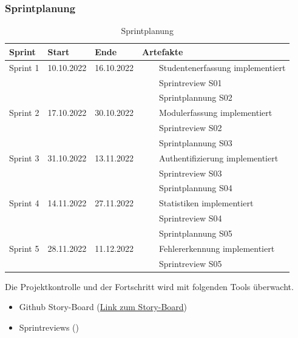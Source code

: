 \documentclass[a4paper, table]{article}
\newcommand{\tabitem}{~~\llap{\textbullet}~~}
\begin{document}
\subsubsection*{Sprintplanung}
\begin{table}[h]
    \centering
    \begin{tabular}{|l|l|l|l|}
        \hline
        \rowcolor[gray]{.9} Sprint & Start & Ende & Artefakte \\
        \hline
        Sprint 1 & 10.10.2022 & 16.10.2022 & \tabitem Studentenerfassung implementiert \\
         & & & \tabitem Sprintreview S01 \\
         & & & \tabitem Sprintplannung S02 \\
        \hline
        Sprint 2 & 17.10.2022 & 30.10.2022 & \tabitem Modulerfassung implementiert \\
         & & & \tabitem Sprintreview S02 \\
         & & & \tabitem Sprintplannung S03 \\
        \hline
        Sprint 3 & 31.10.2022 & 13.11.2022 & \tabitem Authentifizierung implementiert \\
         & & & \tabitem Sprintreview S03 \\
         & & & \tabitem Sprintplannung S04 \\
        \hline
        Sprint 4 & 14.11.2022 & 27.11.2022 & \tabitem Statistiken implementiert \\
         & & & \tabitem Sprintreview S04 \\
         & & & \tabitem Sprintplannung S05 \\
        \hline
        Sprint 5 & 28.11.2022 & 11.12.2022 & \tabitem Fehlererkennung implementiert \\
         & & & \tabitem Sprintreview S05 \\
        \hline
    \end{tabular}
    \caption{Sprintplanung}
    \label{tab: Sprintplanung}
\end{table}

Die Projektkontrolle und der Fortschritt wird mit folgenden Tools überwacht.
\begin{itemize}
    \item Github Story-Board (\href{https://github.com/orgs/stairch/projects/1/views/4}{Link zum Story-Board})
    \item Sprintreviews ()
\end{itemize}
\end{document}

